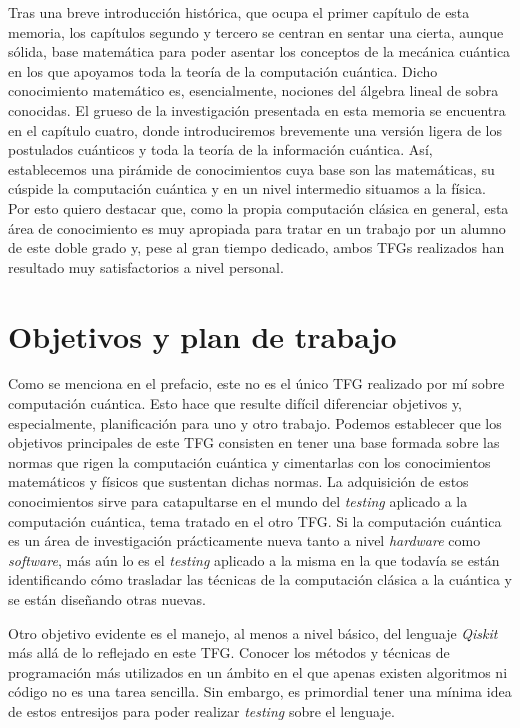 Tras una breve introducción histórica, que ocupa el primer capítulo de esta memoria, los capítulos segundo y tercero se centran en sentar una cierta, aunque sólida, base matemática para poder asentar los conceptos de la mecánica cuántica en los que apoyamos toda la teoría de la computación cuántica. Dicho conocimiento matemático es, esencialmente, nociones del álgebra lineal de sobra conocidas. El grueso de la investigación presentada en esta memoria se encuentra en el capítulo cuatro, donde introduciremos brevemente una versión ligera de los postulados cuánticos y toda la teoría de la información cuántica.
%
Así, establecemos una pirámide de conocimientos cuya base son las matemáticas, su cúspide la computación cuántica y en un nivel intermedio situamos a la física. Por esto quiero destacar que, como la propia computación clásica en general, esta área de conocimiento es muy apropiada para tratar en un trabajo por un alumno de este doble grado y, pese al gran tiempo dedicado, ambos TFGs realizados han resultado muy satisfactorios a nivel personal.

\chapter*{Objetivos y plan de trabajo}

Como se menciona en el prefacio, este no es el único TFG realizado por mí sobre computación cuántica. Esto hace que resulte difícil diferenciar objetivos y, especialmente, planificación para uno y otro trabajo.
%
Podemos establecer que los objetivos principales de este TFG consisten en tener una base formada sobre las normas que rigen la computación cuántica y cimentarlas con los conocimientos matemáticos y físicos que sustentan dichas normas. La adquisición de estos conocimientos sirve para catapultarse en el mundo del \textit{testing} aplicado a la computación cuántica, tema tratado en el otro TFG. Si la computación cuántica es un área de investigación prácticamente nueva tanto a nivel \textit{hardware} como \textit{software}, más aún lo es el \textit{testing} aplicado a la misma en la que todavía se están identificando cómo trasladar las técnicas de la computación clásica a la cuántica y se están diseñando otras nuevas.

Otro objetivo evidente es el manejo, al menos a nivel básico, del lenguaje \textit{Qiskit} más allá de lo reflejado en este TFG. Conocer los métodos y técnicas de programación más utilizados en un ámbito en el que apenas existen algoritmos ni código no es una tarea sencilla. Sin embargo, es primordial tener una mínima idea de estos entresijos para poder realizar \textit{testing} sobre el lenguaje.

